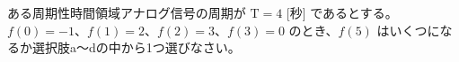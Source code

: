 ある周期性時間領域アナログ信号の周期が $\textrm{T} = 4$ [秒] であるとする。
$f(0) = -1$、$f(1) = 2$、$f(2) = 3$、$f(3) = 0$ のとき、$f(5)$ はいくつになるか選択肢a〜dの中から1つ選びなさい。
